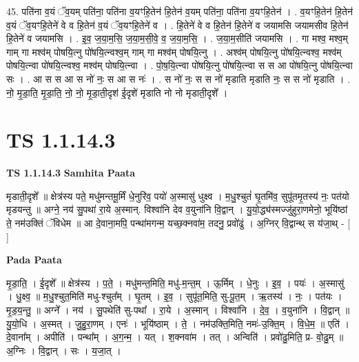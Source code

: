 \documentclass[17pt]{extarticle}
\begin{document}
45. पति॑ना व॒यं ॅव॒यम् पति॑ना॒ पति॑ना व॒यꣳहि॒तेन॑ हि॒तेन॑ व॒यम् पति॑ना॒ पति॑ना व॒यꣳहि॒तेन॑ । . व॒यꣳहि॒तेन॑ हि॒तेन॑ व॒यं ॅव॒यꣳहि॒तेने॑ वे व हि॒तेन॑ व॒यं ॅव॒यꣳहि॒तेने॑ व । . हि॒तेने॑ वे व हि॒तेन॑ हि॒तेने॑ व जयामसि जयामसीव हि॒तेन॑ हि॒तेने॑ व जयामसि । . इ॒व॒ ज॒या॒म॒सि॒ ज॒या॒म॒सी॒वे॒ व॒ ज॒या॒म॒सि॒ । . ज॒या॒म॒सीति॑ जयामसि । . गा मश्व॒ मश्व॒म् गाम् गा मश्व॑म् पोषयि॒त्नु पो॑षयि॒त्न्वश्व॒म् गाम् गा मश्व॑म् पोषयि॒त्नु । . अश्व॑म् पोषयि॒त्नु पो॑षयि॒त्न्वश्व॒ मश्व॑म् पोषयि॒त्न्वा पो॑षयि॒त्न्वश्व॒ मश्व॑म् पोषयि॒त्न्वा । . पो॒ष॒यि॒त्न्वा पो॑षयि॒त्नु पो॑षयि॒त्न्वा स स आ पो॑षयि॒त्नु पो॑षयि॒त्न्वा सः । . आ स स आ स नो॑ नः॒ स आ स नः॑ । . स नो॑ नः॒ स स नो॑ मृडाति मृडाति नः॒ स स नो॑ मृडाति । . नो॒ मृ॒डा॒ति॒ मृ॒डा॒ति॒ नो॒ नो॒ मृ॒डा॒ती॒दृश॑ ई॒दृशे॑ मृडाति नो नो मृडाती॒दृशे᳚ । \newline
\pagebreak
{}

\section{ TS 1.1.14.3 }

\textbf{TS 1.1.14.3 } \newline
\textbf{Samhita Paata} \newline

मृडाती॒दृशे᳚ ॥ क्षेत्र॑स्य पते॒ मधु॑मन्तमू॒र्मिं धे॒नुरि॑व॒ पयो॑ अ॒स्मासु॑ धुक्ष्व । म॒धु॒श्चुतं॑ घृ॒तमि॑व॒ सुपू॑तमृ॒तस्य॑ नः॒ पत॑यो मृडयन्तु ॥ अग्ने॒ नय॑ सु॒पथा॑ रा॒ये अ॒स्मान्. विश्वा॑नि देव व॒युना॑नि वि॒द्वान् । यु॒यो॒द्ध्य॑स्मज्जु॑हुरा॒णमेनो॒ भूयि॑ष्ठां ते॒ नम॑उक्तिं ॅविधेम ॥ आ दे॒वाना॒मपि॒ पन्था॑मगन्म॒ यच्छ॒क्नवा॑म॒ तदनु॒ प्रवो॑ढुं । अ॒ग्निर् वि॒द्वान्थ् स य॑जा॒थ् - [ ] \newline

\textbf{Pada Paata} \newline

मृ॒डा॒ति॒ । ई॒दृशे᳚ ॥ क्षेत्र॑स्य । प॒ते॒ । मधु॑मन्त॒मिति॒ मधु॑-म॒न्त॒म् । ऊ॒र्मिम् । धे॒नुः । इ॒व॒ । पयः॑ । अ॒स्मासु॑ । धु॒क्ष्व॒ ॥ म॒धु॒श्चुत॒मिति॑ मधु-श्चुत᳚म् । घृ॒तम् । इ॒व॒ । सुपू॑त॒मिति॒ सु-पू॒त॒म् । ऋ॒तस्य॑ । नः॒ । पत॑यः । मृ॒ड॒य॒न्तु॒ ॥ अग्ने᳚ । नय॑ । सु॒पथेति॑ सु-पथा᳚ । रा॒ये । अ॒स्मान् । विश्वा॑नि । दे॒व॒ । व॒युना॑नि । वि॒द्वान् ॥ यु॒यो॒धि । अ॒स्मत् । जु॒हु॒रा॒णम् । एनः॑ । भूयि॑ष्ठाम् । ते॒ । नम॑उक्ति॒मिति॒ नमः॑-उ॒क्ति॒म् । वि॒धे॒म॒ ॥ एति॑ । दे॒वाना᳚म् । अपीति॑ । पन्था᳚म् । अ॒ग॒न्म॒ । यत् । श॒क्नवा॑म । तत् । अन्विति॑ । प्रवो॑ढु॒मिति॒ प्र- वो॒ढु॒म् ॥ अ॒ग्निः । वि॒द्वान् । सः । य॒जा॒त् ।  \newline
\end{document}
